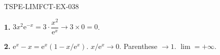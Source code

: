 \begin{corrige}{TSPE-LIMFCT-EX-038}

\textbf{1.} $3x^2\mathrm{e}^{-x} = 3 \cdot \dfrac{x^2}{\mathrm{e}^x} \to 3 \times 0 = \boxed{0}$.

\textbf{2.} $\mathrm{e}^x - x = \mathrm{e}^x(1 - x/\mathrm{e}^x)$. $x/\mathrm{e}^x \to 0$. Parenthese $\to 1$. $\boxed{\lim = +\infty}$.

\end{corrige}
